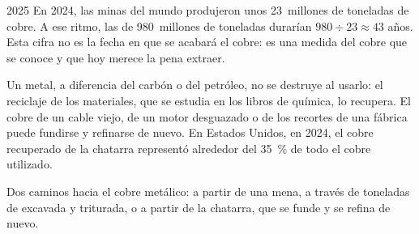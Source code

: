 \begin{dated}{2025}
En 2024, las minas del mundo produjeron unos 23~millones de toneladas de
cobre. A ese ritmo, las  de 980~millones de toneladas durarían
$980 \div 23
\approx 43$ años. Esta cifra no es la fecha en que se acabará el cobre:
es una medida del cobre que se conoce y que hoy merece la pena extraer.
\end{dated}

Un metal, a diferencia del carbón o del petróleo, no se destruye al
usarlo: el reciclaje de los materiales, que se estudia en los libros de
química, lo recupera. El cobre de un cable viejo, de un motor desguazado
o de los recortes de una fábrica puede fundirse y refinarse de nuevo. En
Estados Unidos, en 2024, el cobre recuperado de la chatarra representó
alrededor del \qty{35}{\%} de todo el cobre utilizado.

\begin{omfigure}

{\small Dos caminos hacia el cobre metálico: a partir de una mena, a
través de toneladas de  excavada y triturada, o a partir de la
chatarra, que se funde y se refina de nuevo.}
\end{omfigure}

